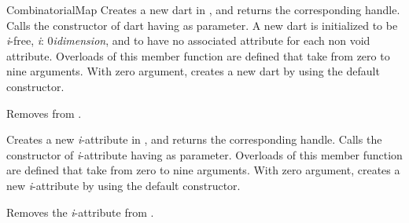 \begin{ccRefConcept}{CombinatorialMap}
  {Creates a new dart in , and returns the corresponding handle.
   Calls the constructor of dart having  as parameter.
   A new dart is initialized to be \emph{i}-free,
   \myforall{}\emph{i}: 0\myleq{}\emph{i}\myleq{}\emph{dimension}, and to have no associated 
   attribute for each non void attribute.
   Overloads of this member function are defined that take from zero to nine arguments.
   With zero argument,  creates a new dart by using the default constructor.
   }

   {Removes  from .
}

  {Creates a new \emph{i}-attribute in , and returns the corresponding handle.
   Calls the constructor of \emph{i}-attribute having  as parameter.
   Overloads of this member function are defined that take from zero to nine arguments.
   With zero argument,  creates a new \emph{i}-attribute by using the default constructor.
   }

	

{Removes the \emph{i}-attribute  from .
  }


\end{ccRefConcept}
